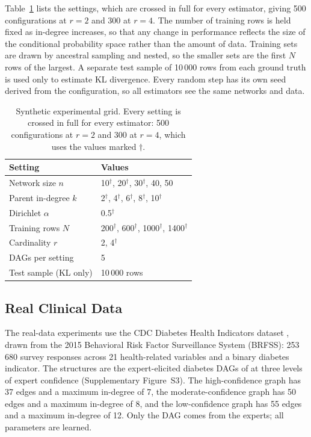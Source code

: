 \documentclass[a4paper,fleqn]{cas-dc}
\begin{document}
Table~\ref{tab:grid} lists the settings, which are crossed in full for every estimator, giving 500 configurations at $r=2$ and 300 at $r=4$. The number of training rows is held fixed as in-degree increases, so that any change in performance reflects the size of the conditional probability space rather than the amount of data. Training sets are drawn by ancestral sampling and nested, so the smaller sets are the first $N$ rows of the largest. A separate test sample of 10\,000 rows from each ground truth is used only to estimate KL divergence. Every random step has its own seed derived from the configuration, so all estimators see the same networks and data.

\begin{table}[tbp]
\caption{Synthetic experimental grid. Every setting is crossed in full for every estimator: 500 configurations at $r{=}2$ and 300 at $r{=}4$, which uses the values marked $\dagger$.}\label{tab:grid}
\begin{tabular*}{\tblwidth}{@{\extracolsep{\fill}}ll@{}}
\toprule
Setting & Values \\
\midrule
Network size $n$ & 10$^\dagger$, 20$^\dagger$, 30$^\dagger$, 40, 50 \\
Parent in-degree $k$ & 2$^\dagger$, 4$^\dagger$, 6$^\dagger$, 8$^\dagger$, 10$^\dagger$ \\
Dirichlet $\alpha$ & 0.5$^\dagger$ \\
Training rows $N$ & 200$^\dagger$, 600$^\dagger$, 1000$^\dagger$, 1400$^\dagger$ \\
Cardinality $r$ & 2, 4$^\dagger$ \\
DAGs per setting & 5 \\
Test sample (KL only) & 10\,000 rows \\
\bottomrule
\end{tabular*}
\end{table}

\subsection{Real Clinical Data}\label{sec:realdata}

The real-data experiments use the CDC Diabetes Health Indicators dataset \citep{cdc_diabetes_2023}, drawn from the 2015 Behavioral Risk Factor Surveillance System (BRFSS): 253\,680 survey responses across 21 health-related variables and a binary diabetes indicator. The structures are the expert-elicited diabetes DAGs of \citet{zahoor2025investigatingvaliditystructurelearning} at three levels of expert confidence (Supplementary Figure~S3). The high-confidence graph has 37 edges and a maximum in-degree of 7, the moderate-confidence graph has 50 edges and a maximum in-degree of 8, and the low-confidence graph has 55 edges and a maximum in-degree of 12. Only the DAG comes from the experts; all parameters are learned.
\end{document}
